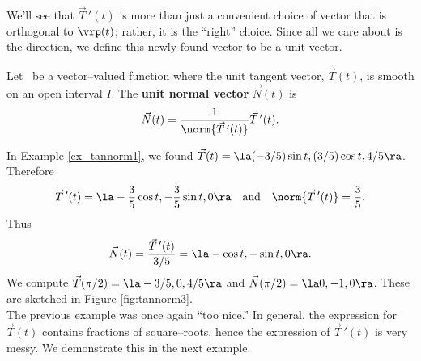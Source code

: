 We'll see that $\vec T\,'(t)$ is more than just a convenient choice of vector that is orthogonal to $\vrp(t)$; rather, it is the ``right'' choice. Since all we care about is the direction, we define this newly found vector to be a unit vector.

{Let \vrt\ be a vector--valued function where the unit tangent vector, $\vec T(t)$, is smooth on an open interval $I$. The \textbf{unit normal vector} $\vec N(t)$ is
$$\vec N(t) = \frac1{\norm{\vec T\,'(t)}}\vec T\,'(t).$$
}

{In Example \ref{ex_tannorm1}, we found $\vec T(t) = \la \rule{0pt}{10pt} (-3/5)\sin t,(3/5)\cos t,4/5\ra$. Therefore 
$$\vec T\,'(t) = \la -\frac35\cos t,-\frac35\sin t,0\ra\quad \text{and} \quad \norm{\vec T\,'(t)} = \frac35.$$
Thus $$\vec N(t) = \frac{\vec T\,'(t)}{3/5} = \la -\cos t,-\sin t,0\ra.$$
We compute $\vec T(\pi/2) = \la -3/5,0,4/5\ra$ and $\vec N(\pi/2) = \la 0,-1,0\ra$. These are sketched in Figure \ref{fig:tannorm3}.
}\\

The previous example was once again ``too nice.'' In general, the expression for $\vec T(t)$ contains fractions of square--roots, hence the expression of $\vec T\,'(t)$ is very messy. We demonstrate this in the next example.\\

